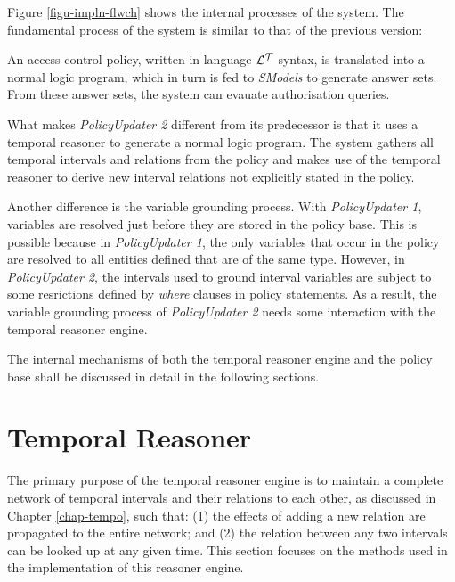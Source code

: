 \documentclass[11pt]{report}
\begin{document}
      Figure \ref{figu-impln-flwch} shows the internal processes of the system.
      The fundamental process of the system is similar to that of the
      previous version:

      An access control policy, written in language ${\cal L^T}$ syntax, is
      translated into a normal logic program, which in turn is fed to
      {\em SModels} to generate answer sets. From these answer sets, the system
      can evauate authorisation queries.

      What makes {\em PolicyUpdater 2} different from its predecessor is that
      it uses a temporal reasoner to generate a normal logic program. The
      system gathers all temporal intervals and relations from the policy and
      makes use of the temporal reasoner to derive new interval relations not
      explicitly stated in the policy.

      Another difference is the variable grounding process. With
      {\em PolicyUpdater 1}, variables are resolved just before they are stored
      in the policy base. This is possible because in {\em PolicyUpdater 1},
      the only variables that occur in the policy are resolved to all entities
      defined that are of the same type. However, in {\em PolicyUpdater 2},
      the intervals used to ground interval variables are subject to some
      resrictions defined by {\em where} clauses in policy statements. As a
      result, the variable grounding process of {\em PolicyUpdater 2} needs
      some interaction with the temporal reasoner engine.

      The internal mechanisms of both the temporal reasoner engine and the
      policy base shall be discussed in detail in the following sections.
      
    \section{Temporal Reasoner}
      \label{sect-impln-treas}

      The primary purpose of the temporal reasoner engine is to maintain a
      complete network of temporal intervals and their relations to each
      other, as discussed in Chapter \ref{chap-tempo}, such that: (1) the
      effects of adding a new relation are propagated to the entire network;
      and (2) the relation between any two intervals can be looked up at any
      given time. This section focuses on the methods used in the
      implementation of this reasoner engine.
\end{document}
